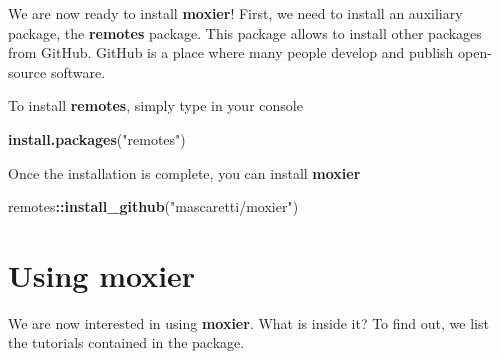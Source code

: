\documentclass[]{book}
\newenvironment{Shaded}{\begin{snugshade}}{\end{snugshade}}
\newcommand{\KeywordTok}[1]{\textcolor[rgb]{0.13,0.29,0.53}{\textbf{#1}}}
\newcommand{\StringTok}[1]{\textcolor[rgb]{0.31,0.60,0.02}{#1}}
\newcommand{\OperatorTok}[1]{\textcolor[rgb]{0.81,0.36,0.00}{\textbf{#1}}}
\newcommand{\NormalTok}[1]{#1}
\begin{document}
We are now ready to install \textbf{moxier}! First, we need to install
an auxiliary package, the \textbf{remotes} package. This package allows
to install other packages from GitHub. GitHub is a place where many
people develop and publish open-source software.

To install \textbf{remotes}, simply type in your console

\begin{Shaded}
\begin{Highlighting}[]
\KeywordTok{install.packages}\NormalTok{(}\StringTok{"remotes"}\NormalTok{)}
\end{Highlighting}
\end{Shaded}

Once the installation is complete, you can install \textbf{moxier}

\begin{Shaded}
\begin{Highlighting}[]
\NormalTok{remotes}\OperatorTok{::}\KeywordTok{install_github}\NormalTok{(}\StringTok{"mascaretti/moxier"}\NormalTok{)}
\end{Highlighting}
\end{Shaded}

\section{\texorpdfstring{Using
\textbf{moxier}}{Using moxier}}\label{using-moxier}

We are now interested in using \textbf{moxier}. What is inside it? To
find out, we list the tutorials contained in the package.
\end{document}
